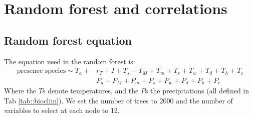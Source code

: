 \section{Random forest and correlations} \label{app::randomForest}
\begin{refsection}
\subsection{Random forest equation}
The equation used in the random forest is:
\begin{equation}
	\begin{split}
	\text{presence species} \sim T_a +{} & r_T + I + T_s + T_M + T_m + T_r + T_w + T_d + T_h + T_c \\
		& P_a + P_M + P_m + P_s + P_w + P_d + P_h + P_c
	\end{split}
\end{equation}
Where the $ T $s denote temperatures, and the $ P $s the precipitations (all defined in Tab \ref{tab::bioclim}). We set the number of trees to 2000 and the number of variables to select at each node to 12.


\end{refsection}
